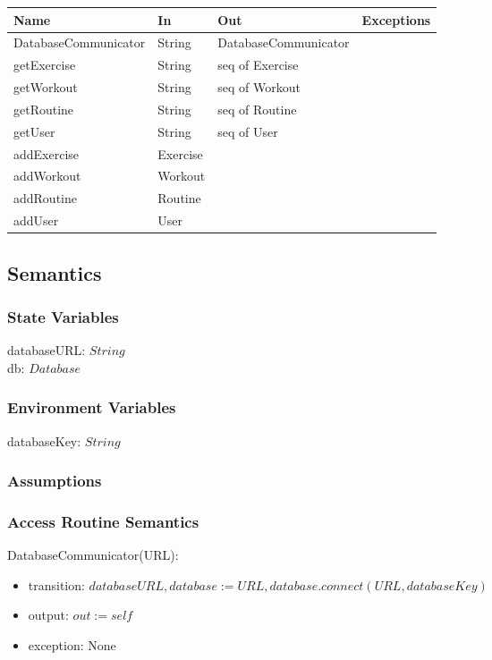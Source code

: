 \documentclass[12pt, titlepage]{article}
\begin{document}
\begin{center}
	\begin{tabular}{p{4cm} p{4cm} p{4cm} p{2cm}}
		\hline
		\textbf{Name} & \textbf{In} & \textbf{Out} & \textbf{Exceptions} \\
		\hline
		DatabaseCommunicator & String & DatabaseCommunicator &  \\
		getExercise & String & seq of Exercise &  \\
		getWorkout & String & seq of Workout &  \\
		getRoutine & String & seq of Routine &  \\
		getUser & String & seq of User &  \\
		addExercise & Exercise &  &  \\
		addWorkout & Workout &  &  \\
		addRoutine & Routine &  &  \\
		addUser & User &  &  \\
		\hline
	\end{tabular}
\end{center}

\subsection{Semantics}

\subsubsection{State Variables}
databaseURL: $String$ \\
db: $Database$
\subsubsection{Environment Variables}
databaseKey: $String$
\subsubsection{Assumptions}

\subsubsection{Access Routine Semantics}

DatabaseCommunicator(URL):
\begin{itemize}
	\item transition: $databaseURL, database := URL, database.connect(URL, databaseKey)$
	\item output: $out := self$
	\item exception: None
\end{itemize}
\end{document}
